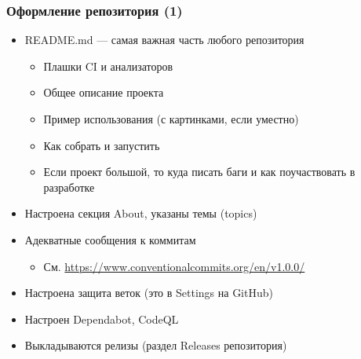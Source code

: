 \documentclass{../../slides-style}
\begin{document}
    \begin{frame}
        \frametitle{Оформление репозитория (1)}
        \begin{itemize}
            \item README.md --- самая важная часть любого репозитория
            \begin{itemize}
                \item Плашки CI и анализаторов
                \item Общее описание проекта
                \item Пример использования (с картинками, если уместно)
                \item Как собрать и запустить
                \item Если проект большой, то куда писать баги и как поучаствовать в разработке
            \end{itemize}
            \item Настроена секция About, указаны темы (topics)
            \item Адекватные сообщения к коммитам
            \begin{itemize}
                \item См. \url{https://www.conventionalcommits.org/en/v1.0.0/}
            \end{itemize}
            \item Настроена защита веток (это в Settings на GitHub)
            \item Настроен Dependabot, CodeQL
            \item Выкладываются релизы (раздел Releases репозитория)
        \end{itemize}
    \end{frame}
\end{document}
